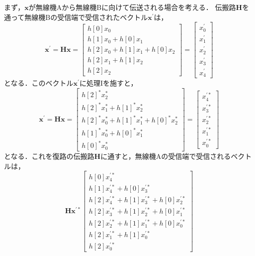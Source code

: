 まず，$\bm{x}$が無線機Aから無線機Bに向けて伝送される場合を考える．
伝搬路$\bm{H}$を通って無線機Bの受信端で受信されたベクトル$\bm{x^{\prime}}$は，
\begin{equation}
    \bm{x^{\prime}} = \bm{Hx} = \left[
        \begin{array}{c}
            h[0]x_0 \\
            h[1]x_0 + h[0]x_1 \\
            h[2]x_0 + h[1]x_1 + h[0]x_2 \\
            h[2]x_1 + h[1]x_2 \\
            h[2]x_2
        \end{array}
    \right]
    = \left[
        \begin{array}{c}
            x_0^{\prime} \\
            x_1^{\prime} \\
            x_2^{\prime} \\
            x_3^{\prime} \\
            x_4^{\prime}
        \end{array}
    \right]
\end{equation}
となる．このベクトル$\bm{x^{\prime}}$に処理Iを施すと，
\begin{equation}
    \bm{x^{\prime}} = \bm{Hx} = \left[
        \begin{array}{c}
            h[2]^*x_2^* \\
            h[2]^*x_1^* + h[1]^*x_2^* \\
            h[2]^*x_0^* + h[1]^*x_1^* + h[0]^*x_2^* \\
            h[1]^*x_0^* + h[0]^*x_1^* \\
            h[0]^*x_0^*
        \end{array}
    \right]
    = \left[
        \begin{array}{c}
            x_4^{\prime*} \\
            x_3^{\prime*} \\
            x_2^{\prime*} \\
            x_1^{\prime*} \\
            x_0^{\prime*}
        \end{array}
    \right]
\end{equation}
となる．これを復路の伝搬路$\bm{H}$に通すと，無線機Aの受信端で受信されるベクトルは，
\begin{equation}
    \bm{Hx^{\prime*}} \left[
        \begin{array}{c}
            h[0]x_4^{\prime*} \\
            h[1]x_4^{\prime*}+h[0]x_3^{\prime*} \\
            h[2]x_4^{\prime*}+h[1]x_3^{\prime*}+h[0]x_2^{\prime*} \\
            h[2]x_3^{\prime*}+h[1]x_2^{\prime*}+h[0]x_1^{\prime*} \\
            h[2]x_2^{\prime*}+h[1]x_1^{\prime*}+h[0]x_0^{\prime*} \\
            h[2]x_1^{\prime*}+h[1]x_0^{\prime*} \\
            h[2]x_0^{\prime*}
        \end{array}
    \right]
\end{equation}
